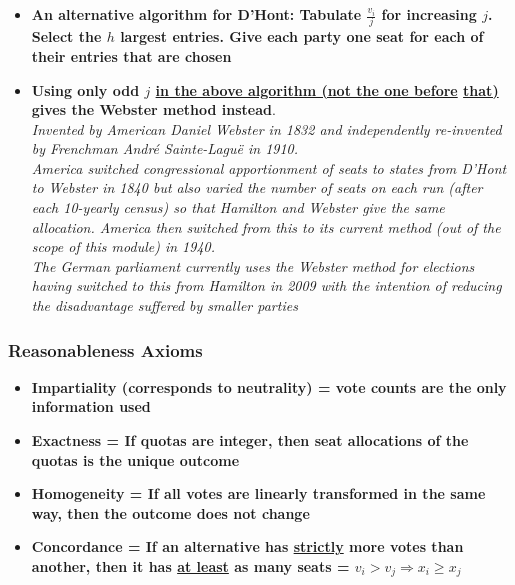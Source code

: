\documentclass[20pt,a4paper,landscape]{extarticle}
\begin{document}
\begin{flushleft}
\begin{itemize}
\item \textbf{An alternative algorithm for D'Hont: Tabulate $\frac{v_i}{j}$ for increasing $j$. Select the $h$ largest entries. Give each party one seat for each of their entries that are chosen}
\item \textbf{Using only odd $j$ \underline{in the above algorithm (not the one before} \underline{that)} gives the Webster method instead}.\\
\textit{Invented by American Daniel Webster in 1832 and independently re-invented by Frenchman André Sainte-Laguë in 1910.\\
America switched congressional apportionment of seats to states from D'Hont to Webster in 1840 but also varied the number of seats on each run (after each 10-yearly census) so that Hamilton and Webster give the same allocation. America then switched from this to its current method (out of the scope of this module) in 1940.\\
The German parliament currently uses the Webster method for elections having switched to this from Hamilton in 2009 with the intention of reducing the disadvantage suffered by smaller parties}
\end{itemize}
\clearpage
\subsubsection{Reasonableness Axioms}
\begin{itemize}
\item \textbf{Impartiality (corresponds to neutrality) = vote counts are the only information used}
\item \textbf{Exactness = If quotas are integer, then seat allocations of the quotas is the unique outcome}
\item \textbf{Homogeneity = If all votes are linearly transformed in the same way, then the outcome does not change}
\item \textbf{Concordance = If an alternative has \underline{strictly} more votes than another, then it has \underline{at least} as many seats = $v_i > v_j \Rightarrow x_i \geq x_j$}
\end{itemize}
\clearpage

\end{flushleft}
\end{document}
